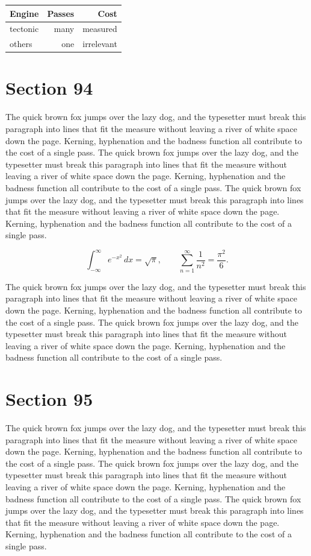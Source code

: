 \documentclass{article}
\begin{document}
\begin{center}
\begin{tabular}{lrr}
\toprule
Engine & Passes & Cost \\
\midrule
tectonic & many & measured \\
others & one & irrelevant \\
\bottomrule
\end{tabular}
\end{center}

\section{Section 94}
The quick brown fox jumps over the lazy dog, and the typesetter must break this paragraph into lines that fit the measure without leaving a river of white space down the page. Kerning, hyphenation and the badness function all contribute to the cost of a single pass. The quick brown fox jumps over the lazy dog, and the typesetter must break this paragraph into lines that fit the measure without leaving a river of white space down the page. Kerning, hyphenation and the badness function all contribute to the cost of a single pass. The quick brown fox jumps over the lazy dog, and the typesetter must break this paragraph into lines that fit the measure without leaving a river of white space down the page. Kerning, hyphenation and the badness function all contribute to the cost of a single pass. 

\begin{equation}
\int_{-\infty}^{\infty} e^{-x^{2}}\,dx = \sqrt{\pi}, \qquad
\sum_{n=1}^{\infty} \frac{1}{n^{2}} = \frac{\pi^{2}}{6}.
\end{equation}

The quick brown fox jumps over the lazy dog, and the typesetter must break this paragraph into lines that fit the measure without leaving a river of white space down the page. Kerning, hyphenation and the badness function all contribute to the cost of a single pass. The quick brown fox jumps over the lazy dog, and the typesetter must break this paragraph into lines that fit the measure without leaving a river of white space down the page. Kerning, hyphenation and the badness function all contribute to the cost of a single pass. 
\section{Section 95}
The quick brown fox jumps over the lazy dog, and the typesetter must break this paragraph into lines that fit the measure without leaving a river of white space down the page. Kerning, hyphenation and the badness function all contribute to the cost of a single pass. The quick brown fox jumps over the lazy dog, and the typesetter must break this paragraph into lines that fit the measure without leaving a river of white space down the page. Kerning, hyphenation and the badness function all contribute to the cost of a single pass. The quick brown fox jumps over the lazy dog, and the typesetter must break this paragraph into lines that fit the measure without leaving a river of white space down the page. Kerning, hyphenation and the badness function all contribute to the cost of a single pass. 
\end{document}
